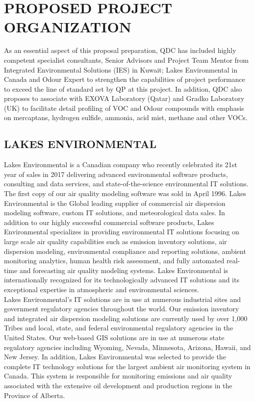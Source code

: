 \section{PROPOSED PROJECT ORGANIZATION}

As an essential aspect of this proposal preparation, QDC has included highly competent specialist consultants, Senior Advisors and Project Team Mentor from Integrated Environmental Solutions (IES) in Kuwait; Lakes Environmental in Canada and Odour Expert to strengthen   the capabilities of project performance to exceed the line of standard set by QP at this project. In addition, QDC also proposes to associate with EXOVA Laboratory (Qatar) and Gradko Laboratory (UK) to facilitate detail profiling of VOC and Odour compounds with emphasis on mercaptans, hydrogen sulfide, ammonia, acid mist, methane and other VOCs.

\subsection{LAKES ENVIRONMENTAL}

Lakes Environmental is a Canadian company who recently celebrated its 21st year of sales in 2017 delivering advanced environmental software products, consulting and data services, and state-of-the-science environmental IT solutions. The first copy of our air quality modeling software was sold in April 1996. Lakes Environmental is the Global leading supplier of commercial air dispersion modeling software, custom IT solutions, and meteorological data sales. In addition to our highly successful commercial software products, Lakes Environmental specializes in providing  environmental IT solutions focusing on large scale air quality capabilities such as emission inventory solutions, air dispersion modeling, environmental compliance and reporting solutions, ambient monitoring analytics, human health risk assessment, and fully automated real-time and forecasting air quality modeling systems. Lakes Environmental is internationally recognized for its technologically advanced IT solutions and its exceptional expertise in atmospheric and environmental sciences.\\

Lakes Environmental’s IT solutions are in use at numerous industrial sites and government regulatory agencies throughout the world. Our emission inventory and integrated air dispersion modeling solutions are currently used by over 1,000 Tribes and local, state, and federal environmental regulatory agencies in the United States. Our web-based GIS solutions are in use at numerous state regulatory agencies including Wyoming, Nevada, Minnesota, Arizona, Hawaii, and New Jersey. In addition, Lakes Environmental was selected to provide the complete IT technology solutions for the largest ambient air monitoring system in Canada. This system is responsible for monitoring emissions and air quality associated with the extensive oil development and production regions in the Province of Alberta.\\


